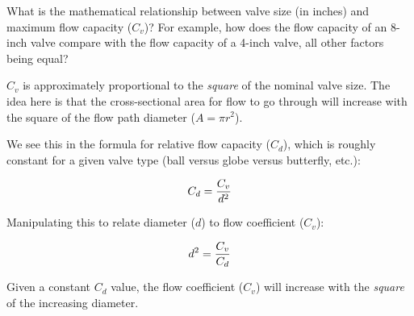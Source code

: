 

What is the mathematical relationship between valve size (in inches) and maximum flow capacity ($C_v$)?  For example, how does the flow capacity of an 8-inch valve compare with the flow capacity of a 4-inch valve, all other factors being equal?







$C_v$ is approximately proportional to the {\it square} of the nominal valve size.  The idea here is that the cross-sectional area for flow to go through will increase with the square of the flow path diameter ($A = \pi r^2$).

We see this in the formula for relative flow capacity ($C_d$), which is roughly constant for a given valve type (ball versus globe versus butterfly, etc.):

$$C_d = {C_v \over d^2}$$

Manipulating this to relate diameter ($d$) to flow coefficient ($C_v$):

$$d^2 = {C_v \over C_d}$$

Given a constant $C_d$ value, the flow coefficient ($C_v$) will increase with the {\it square} of the increasing diameter.











